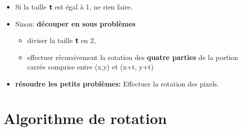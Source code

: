 \documentclass[svgnames,11pt]{beamer}
\begin{document}
\begin{frame}
    \frametitle{}

    \begin{itemize}
        \item Si la taille \texttt{\textbf{t}} est égal à 1, ne rien faire.
        \item Sinon: \textbf{découper en sous problèmes}
        \begin{itemize}
            \item diviser la taille \textbf{\texttt{t}} en 2,
            \item effectuer récursivement la rotation des \textbf{quatre parties} de la portion carrée comprise entre (x,y) et (x+t, y+t)
        \end{itemize}
        \item \textbf{résoudre les petits problèmes:} Effectuer la rotation des pixels.
    \end{itemize}

\end{frame}
\section{Algorithme de rotation}
\end{document}
